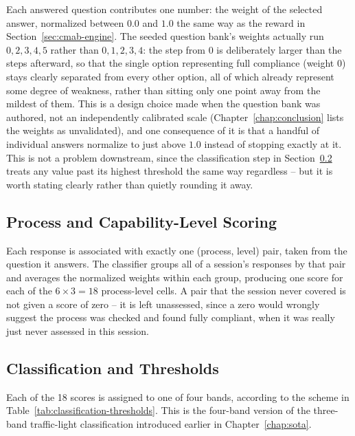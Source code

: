 \documentclass[a4paper, 12pt, oneside, openany, BCOR1cm,toc=chapterentrywithdots]{scrbook}
\begin{document}
Each answered question contributes one number: the weight of the selected answer, normalized
between $0.0$ and $1.0$ the same way as the reward in Section~\ref{sec:cmab-engine}. The seeded
question bank's weights actually run $0, 2, 3, 4, 5$ rather than $0, 1, 2, 3, 4$: the step from 0
is deliberately larger than the steps afterward, so that the single option representing full
compliance (weight 0) stays clearly separated from every other option, all of which already
represent some degree of weakness, rather than sitting only one point away from the mildest of
them. This is a design choice made when the question bank was authored, not an independently
calibrated scale (Chapter~\ref{chap:conclusion} lists the weights as unvalidated), and one
consequence of it is that a handful of individual answers normalize to just above $1.0$ instead
of stopping exactly at it. This is not a problem downstream, since the classification step in
Section~\ref{sec:classification-thresholds} treats any value past its highest threshold the same
way regardless -- but it is worth stating clearly rather than quietly rounding it away.

\subsection{Process and Capability-Level Scoring}

Each response is associated with exactly one (process, level) pair, taken from the question it
answers. The classifier groups all of a session's responses by that pair and averages the
normalized weights within each group, producing one score for each of the $6 \times 3 = 18$
process-level cells. A pair that the session never covered is not given a score of zero -- it is
left unassessed, since a zero would wrongly suggest the process was checked and found fully
compliant, when it was really just never assessed in this session.

\subsection{Classification and Thresholds}
\label{sec:classification-thresholds}

Each of the 18 scores is assigned to one of four bands, according to the scheme in
Table~\ref{tab:classification-thresholds}. This is the four-band version of the three-band
traffic-light classification introduced earlier in Chapter~\ref{chap:sota}.
\end{document}
